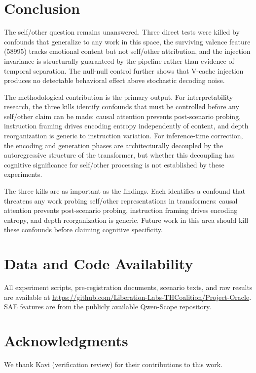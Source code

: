 \documentclass[11pt,a4paper]{article}
\begin{document}
\section{Conclusion}
\label{sec:conclusion}

The self/other question remains unanswered. Three direct tests were killed
by confounds that generalize to any work in this space, the surviving
valence feature (58995) tracks emotional content but not self/other
attribution, and the injection invariance is structurally guaranteed by
the pipeline rather than evidence of temporal separation. The null-null
control further shows that V-cache injection produces no detectable
behavioral effect above stochastic decoding noise.

The methodological contribution is the primary output. For interpretability
research, the three kills identify confounds that must be controlled before
any self/other claim can be made: causal attention prevents post-scenario
probing, instruction framing drives encoding entropy independently of
content, and depth reorganization is generic to instruction variation.
For inference-time correction, the encoding and generation phases are
architecturally decoupled by the autoregressive structure of the
transformer, but whether this decoupling has cognitive significance for
self/other processing is not established by these experiments.

The three kills are as important as the findings. Each identifies a confound
that threatens any work probing self/other representations in transformers:
causal attention prevents post-scenario probing, instruction framing drives
encoding entropy, and depth reorganization is generic. Future work in this
area should kill these confounds before claiming cognitive specificity.

\section*{Data and Code Availability}

All experiment scripts, pre-registration documents, scenario texts, and raw
results are available at
\url{https://github.com/Liberation-Labs-THCoalition/Project-Oracle}.
SAE features are from the publicly available Qwen-Scope repository.


\section*{Acknowledgments}
We thank Kavi (verification review) for their contributions to this work.



\end{document}
